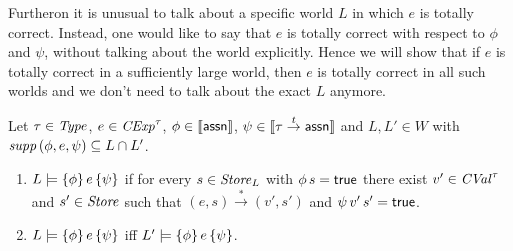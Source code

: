 \documentclass[12pt,a4paper]{report}
\newcommand{\CExp}{\nstyle{CExp}}
\newcommand{\CVal}{\nstyle{CVal}}
\begin{document}
Furtheron it is unusual to talk about a specific world $L$ in which $e$ is totally correct. Instead, one would
like to say that $e$ is totally correct with respect to $\phi$ and $\psi$, without talking about the world
explicitly. Hence we will show that if $e$ is totally correct in a sufficiently large world, then $e$ is
totally correct in all such worlds and we don't need to talk about the exact $L$ anymore.

\begin{lemma}
  Let $\tau\in\mathit{Type}$, $e\in\CExp^\tau$, $\phi\in\llbracket\mathsf{assn}\rrbracket$, $\psi\in\llbracket\tau\stackrel{t}{\to}\mathsf{assn}\rrbracket$
  and $L,L'\in W$ with $\mathit{supp}\,(\phi,e,\psi) \subseteq L \cap L'$.
  \begin{enumerate}
    \item $L\models\{\phi\}\,e\,\{\psi\}$ if for every $s \in \mathit{Store}_L$ with $\phi\,s=\mathsf{true}$ there exist $v'\in\CVal^\tau$ and 
          $s'\in\mathit{Store}$ such that $(e,s) \xrightarrow* (v',s')$ and $\psi\,v'\,s'=\mathsf{true}$.

    \item $L\models\{\phi\}\,e\,\{\psi\}$ iff $L'\models\{\phi\}\,e\,\{\psi\}$.
  \end{enumerate}
\end{lemma}
\end{document}

